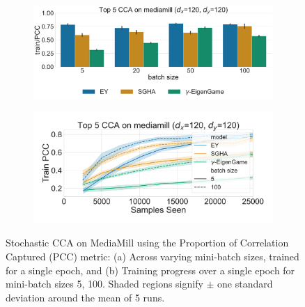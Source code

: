 \begin{figure}
    \centering
    \begin{subfigure}[b]{0.49\textwidth}
        \centering
        \includegraphics[width=\textwidth]{figures/CCA/mediamill_models_different_batch_sizes}
        \caption{}
        \label{fig:corr_mediamill}
    \end{subfigure}
    \hfill
    \begin{subfigure}[b]{0.49\textwidth}
        \centering
        \includegraphics[width=\textwidth]{figures/CCA/mediamill_allbatchsizes_pcc}
        \caption{}
        \label{fig:lr_mediamill}
    \end{subfigure}
    \caption{Stochastic CCA on MediaMill using the Proportion of Correlation Captured (PCC) metric: (a) Across varying mini-batch sizes, trained for a single epoch, and (b) Training progress over a single epoch for mini-batch sizes 5, 100.
    Shaded regions signify \(\pm\) one standard deviation around the mean of 5 runs.}\label{fig:scca_mediamill}
\end{figure}

